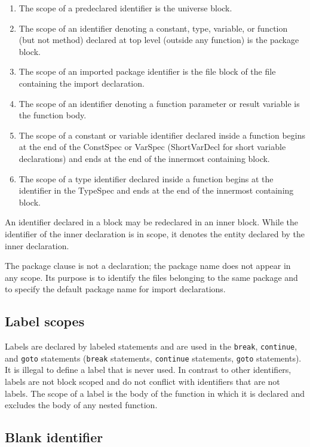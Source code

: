 \begin{enumerate}
\item
  The scope of a predeclared identifier is the universe block.
\item
  The scope of an identifier denoting a constant, type, variable, or
  function (but not method) declared at top level (outside any function)
  is the package block.
\item
  The scope of an imported package identifier is the file block of the
  file containing the import declaration.
\item
  The scope of an identifier denoting a function parameter or result
  variable is the function body.
\item
  The scope of a constant or variable identifier declared inside a
  function begins at the end of the ConstSpec or VarSpec (ShortVarDecl
  for short variable declarations) and ends at the end of the innermost
  containing block.
\item
  The scope of a type identifier declared inside a function begins at
  the identifier in the TypeSpec and ends at the end of the innermost
  containing block.
\end{enumerate}

An identifier declared in a block may be redeclared in an inner block.
While the identifier of the inner declaration is in scope, it denotes
the entity declared by the inner declaration.

The package clause is not a declaration; the
package name does not appear in any scope. Its purpose is to identify
the files belonging to the same package and to
specify the default package name for import declarations.

\subsection*{Label scopes}

Labels are declared by labeled statements and are used in the
\texttt{break}, \texttt{continue}, and \texttt{goto} statements
(\texttt{break} statements, \texttt{continue} statements,
\texttt{goto} statements). It is illegal to define a label that is never
used. In contrast to other identifiers, labels are not block scoped
and do not conflict with identifiers that are not labels. The scope
of a label is the body of the function in which it is declared and
excludes the body of any nested function.

\subsection*{Blank identifier}

